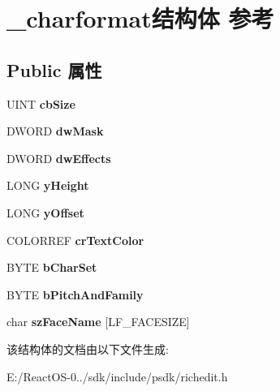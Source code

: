 \hypertarget{struct__charformat}{}\section{\+\_\+charformat结构体 参考}
\label{struct__charformat}
\subsection*{Public 属性}
\begin{DoxyCompactItemize}
\item 
\mbox{\label{struct__charformat_a0e8306628ecc074a00011f0c5727bb8d}} 
U\+I\+NT {\bfseries cb\+Size}
\item 
\mbox{\label{struct__charformat_afc0f1fb7cae7821f448acc8604def058}} 
D\+W\+O\+RD {\bfseries dw\+Mask}
\item 
\mbox{\label{struct__charformat_a3379460911a27335ee69232d71a920ea}} 
D\+W\+O\+RD {\bfseries dw\+Effects}
\item 
\mbox{\label{struct__charformat_a7992636028da21796aa29c7eaa888e5a}} 
L\+O\+NG {\bfseries y\+Height}
\item 
\mbox{\label{struct__charformat_afec2ca6e59cd237251467837155d6421}} 
L\+O\+NG {\bfseries y\+Offset}
\item 
\mbox{\label{struct__charformat_a7f02c025cea25dd4b169003929ea66c9}} 
C\+O\+L\+O\+R\+R\+EF {\bfseries cr\+Text\+Color}
\item 
\mbox{\label{struct__charformat_a2080c2373f72d1a4808ae8ad71e6352a}} 
B\+Y\+TE {\bfseries b\+Char\+Set}
\item 
\mbox{\label{struct__charformat_abf4a3a2cba54587e25e18f43b41de345}} 
B\+Y\+TE {\bfseries b\+Pitch\+And\+Family}
\item 
\mbox{\label{struct__charformat_a21a45aa8be0cb0b8f22204b012094788}} 
char {\bfseries sz\+Face\+Name} \mbox{[}L\+F\+\_\+\+F\+A\+C\+E\+S\+I\+ZE\mbox{]}
\end{DoxyCompactItemize}


该结构体的文档由以下文件生成\+:\begin{DoxyCompactItemize}
\item 
E\+:/\+React\+O\+S-\/0../sdk/include/psdk/richedit.\+h\end{DoxyCompactItemize}
